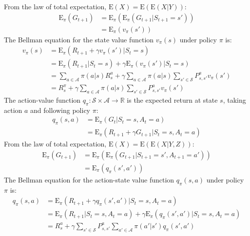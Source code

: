 \documentclass{article}
\begin{document}
From the law of total expectation, $ \text{E}(X) = \text{E}(\text{E}(X|Y)) $:
\begin{equation*}
\begin{split}
\text{E}_{\pi}(G_{t+1}) & = \text{E}_{\pi}(\text{E}_{\pi}(G_{t+1}|S_{t+1} = s')) \\
& = \text{E}_{\pi}(v_{\pi}(s'))
\end{split}
\end{equation*}
The Bellman equation for the state value function $ v_{\pi}(s) $ under policy $\pi $ is:
\begin{equation*}
\begin{split}
v_{\pi}(s) & = \text{E}_{\pi}(R_{t+1} + \gamma v_{\pi}(s') | S_t = s) \\
 & = \text{E}_{\pi}(R_{t+1} | S_t = s) + \gamma \text{E}_{\pi}(v_{\pi}(s') | S_t = s) \\
 & = \sum_{a \in \mathcal{A}} \pi(a | s) R_s^a + \gamma \sum_{a \in \mathcal{A}} \pi(a | s) \sum_{s' \in \mathcal{S}} P_{s,s'}^a v_{\pi}(s') \\
 & = R_s^{\pi} + \gamma \sum_{a \in \mathcal{A}} \pi(a | s) \sum_{s' \in \mathcal{S}} P_{s,s'}^a v_{\pi}(s')
\end{split}
\end{equation*}
The action-value function $ q_{\pi}: \mathcal{S} \times \mathcal{A} \to \mathbb{R} $ is the expected return at state $ s $, taking action $ a $ and following policy $ \pi $:
\begin{equation*}
\begin{split}
q_{\pi}(s,a) & = \text{E}_{\pi}(G_t | S_t = s, A_t = a) \\
 & = \text{E}_{\pi}(R_{t+1} + \gamma G_{t+1} | S_t = s, A_t = a)
\end{split}
\end{equation*}
From the law of total expectation, $ \text{E}(X) = \text{E}(\text{E}(X|Y,Z)) $:
\begin{equation*}
\begin{split}
\text{E}_{\pi}(G_{t+1}) & = \text{E}_{\pi}(\text{E}_{\pi}(G_{t+1}|S_{t+1} = s', A_{t+1} = a')) \\
& = \text{E}_{\pi}(q_{\pi}(s',a'))
\end{split}
\end{equation*}
The Bellman equation for the action-state value function $ q_{\pi}(s,a) $ under policy $\pi $ is:
\begin{equation*}
\begin{split}
q_{\pi}(s,a) & = \text{E}_{\pi}(R_{t+1} + \gamma q_{\pi}(s',a') | S_t = s, A_t = a) \\
 & = \text{E}_{\pi}(R_{t+1} | S_t = s, A_t = a) + \gamma \text{E}_{\pi}(q_{\pi}(s',a') | S_t = s, A_t = a) \\
 & = R_s^a + \gamma \sum_{s' \in \mathcal{S}} P_{s,s'}^a \sum_{a' \in \mathcal{A}} \pi(a' | s') q_{\pi}(s',a')
\end{split}
\end{equation*}
\end{document}
